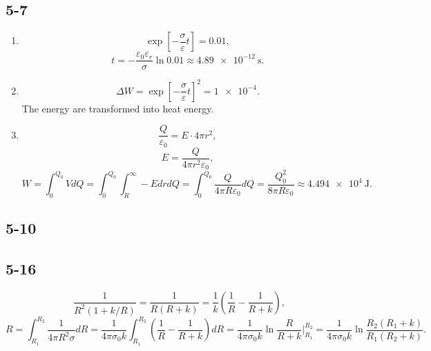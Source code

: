 \documentclass[11pt,a4paper]{article}
\author{\href{liuyh615@sjtu.edu.cn}{Yihao Liu} (515370910207)}
\subtitle{Homework}
\begin{document}
\maketitle

\subsection{5-7}
\begin{enumerate}[label=\alph*)]
\item
$$\exp\left[-\frac{\sigma}{\varepsilon}t\right]=0.01,$$
$$t=-\frac{\varepsilon_0\varepsilon_r}{\sigma}\ln0.01\approx \SI{4.89e-12}{\second}.$$
\item
$$\Delta W=\exp\left[-\frac{\sigma}{\varepsilon}t\right]^2=\num{1e-4}.$$
The energy are transformed into heat energy.
\item
$$\frac{Q}{\varepsilon_0}=E\cdot 4\pi r^2,$$
$$E=\frac{Q}{4\pi r^2\varepsilon_0},$$
$$W=\int_0^{Q_0} VdQ=\int_0^{Q_0}\int_R^\infty-EdrdQ=\int_0^{Q_0}\frac{Q}{4\pi R\varepsilon_0}dQ=\frac{Q_0^2}{8\pi R\varepsilon_0}\approx\SI{4.494e4}{\joule}.$$
\end{enumerate}

\subsection{5-10}

\subsection{5-16}
$$\frac{1}{R^2(1+k/R)}=\frac{1}{R(R+k)}=\frac{1}{k}\left(\frac{1}{R}-\frac{1}{R+k}\right),$$
$$R=\int_{R_1}^{R_2}\frac{1}{4\pi R^2\sigma}dR=\frac{1}{4\pi\sigma_0k}\int_{R_1}^{R_2}\left(\frac{1}{R}-\frac{1}{R+k}\right)dR=\frac{1}{4\pi\sigma_0k}\ln\frac{R}{R+k}\bigg|_{R_1}^{R_2}=\frac{1}{4\pi\sigma_0k}\ln\frac{R_2(R_1+k)}{R_1(R_2+k)}.$$
\end{document}
